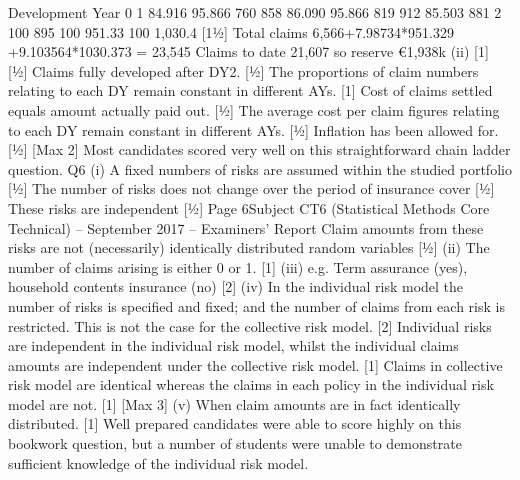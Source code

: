 \documentclass[a4paper,12pt]{article}
\begin{document}
\begin{enumerate}
Development Year
0
1
84.916%
95.866%
760
858
86.090%
95.866%
819
912
85.503%
881
2
100%
895
100%
951.33
100%
1,030.4
[11⁄2]
Total claims 6,566+7.98734*951.329 +9.103564*1030.373 = 23,545
Claims to date 21,607 so reserve €1,938k
(ii)
[1]
[1⁄2]
Claims fully developed after DY2.
[1⁄2]
The proportions of claim numbers relating to each DY remain constant in
different AYs.
[1]
Cost of claims settled equals amount actually paid out.
[1⁄2]
The average cost per claim figures relating to each DY remain constant in
different AYs.
[1⁄2]
Inflation has been allowed for.
[1⁄2]
[Max 2]
Most candidates scored very well on this straightforward chain ladder
question.
Q6
(i)
A fixed numbers of risks are assumed within the studied portfolio [1⁄2]
The number of risks does not change over the period of insurance cover [1⁄2]
These risks are independent [1⁄2]
Page 6Subject CT6 (Statistical Methods Core Technical) – September 2017 – Examiners’ Report
Claim amounts from these risks are not (necessarily) identically distributed
random variables
[1⁄2]
(ii) The number of claims arising is either 0 or 1. [1]
(iii) e.g. Term assurance (yes), household contents insurance (no) [2]
(iv) In the individual risk model the number of risks is specified and fixed; and the
number of claims from each risk is restricted. This is not the case for the
collective risk model.
[2]
Individual risks are independent in the individual risk model, whilst the
individual claims amounts are independent under the collective risk model. [1]
Claims in collective risk model are identical whereas the claims in each policy
in the individual risk model are not.
[1]
[Max 3]
(v)
When claim amounts are in fact identically distributed.
[1]
Well prepared candidates were able to score highly on this bookwork
question, but a number of students were unable to demonstrate
sufficient knowledge of the individual risk model.



\end{enumerate}
\end{document}
